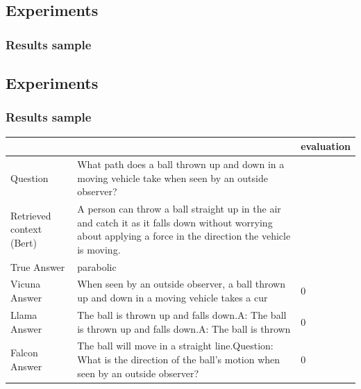 \documentclass[a4paper,12pt]{article}
\begin{document}
\subsection{Experiments}
\label{ann:experiments}
\subsubsection*{Results sample}
\subsection{Experiments}
\label{ann:experiments}
\subsubsection*{Results sample}
\begin{table}[htbp]
    \centering
    \begin{tabular}{|p{3cm} p{7cm} p{2cm}|}
    \hline
        &  & evaluation \\
    \hline
    Question & What path does a ball thrown up and down in a moving vehicle take when seen by an outside observer? & \\
    \hline
    Retrieved context (Bert) & A person can throw a ball straight up in the air and catch it as it falls down without worrying about applying a force in the direction the vehicle is moving. &  \\
    \hline
    True Answer & parabolic & \\
    \hline
    Vicuna Answer & When seen by an outside observer, a ball thrown up and down in a moving vehicle takes a cur & 0 \\
    \hline
    Llama Answer & The ball is thrown up and falls down.\newline \newline A: The ball is thrown up and falls down.\newline \newline A: The ball is thrown & 0\\
    \hline
    Falcon Answer & The ball will move in a straight line.\newline Question: What is the direction of the ball's motion when seen by an outside observer? & 0\\
    \hline
    \end{tabular}
\end{table}
\end{document}
